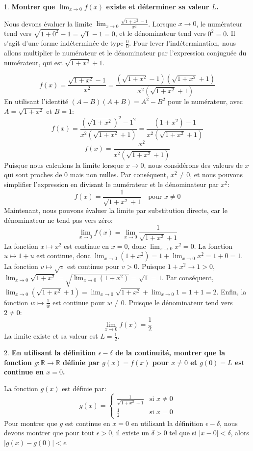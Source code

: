 \documentclass[12pt,a4paper]{report}
\begin{document}
1.  \textbf{Montrer que $\lim_{x \to 0} f(x)$ existe et déterminer sa valeur $L$.}

    Nous devons évaluer la limite $\lim_{x \to 0} \frac{\sqrt{1+x^2} - 1}{x^2}$.
    Lorsque $x \to 0$, le numérateur tend vers $\sqrt{1+0^2} - 1 = \sqrt{1} - 1 = 0$, et le dénominateur tend vers $0^2 = 0$. Il s'agit d'une forme indéterminée de type $\frac{0}{0}$.
    Pour lever l'indétermination, nous allons multiplier le numérateur et le dénominateur par l'expression conjuguée du numérateur, qui est $\sqrt{1+x^2} + 1$.

    $$ f(x) = \frac{\sqrt{1+x^2} - 1}{x^2} = \frac{(\sqrt{1+x^2} - 1)(\sqrt{1+x^2} + 1)}{x^2(\sqrt{1+x^2} + 1)} $$
    En utilisant l'identité $(A-B)(A+B) = A^2 - B^2$ pour le numérateur, avec $A = \sqrt{1+x^2}$ et $B = 1$:
    $$ f(x) = \frac{(\sqrt{1+x^2})^2 - 1^2}{x^2(\sqrt{1+x^2} + 1)} = \frac{(1+x^2) - 1}{x^2(\sqrt{1+x^2} + 1)} $$
    $$ f(x) = \frac{x^2}{x^2(\sqrt{1+x^2} + 1)} $$
    Puisque nous calculons la limite lorsque $x \to 0$, nous considérons des valeurs de $x$ qui sont proches de 0 mais non nulles. Par conséquent, $x^2 \neq 0$, et nous pouvons simplifier l'expression en divisant le numérateur et le dénominateur par $x^2$:
    $$ f(x) = \frac{1}{\sqrt{1+x^2} + 1} \quad \text{pour } x \neq 0 $$
    Maintenant, nous pouvons évaluer la limite par substitution directe, car le dénominateur ne tend pas vers zéro:
    $$ \lim_{x \to 0} f(x) = \lim_{x \to 0} \frac{1}{\sqrt{1+x^2} + 1} $$
    La fonction $x \mapsto x^2$ est continue en $x=0$, donc $\lim_{x \to 0} x^2 = 0$.
    La fonction $u \mapsto 1+u$ est continue, donc $\lim_{x \to 0} (1+x^2) = 1 + \lim_{x \to 0} x^2 = 1+0 = 1$.
    La fonction $v \mapsto \sqrt{v}$ est continue pour $v > 0$. Puisque $1+x^2 \to 1 > 0$, $\lim_{x \to 0} \sqrt{1+x^2} = \sqrt{\lim_{x \to 0} (1+x^2)} = \sqrt{1} = 1$.
    Par conséquent, $\lim_{x \to 0} (\sqrt{1+x^2} + 1) = \lim_{x \to 0} \sqrt{1+x^2} + \lim_{x \to 0} 1 = 1+1 = 2$.
    Enfin, la fonction $w \mapsto \frac{1}{w}$ est continue pour $w \neq 0$. Puisque le dénominateur tend vers $2 \neq 0$:
    $$ \lim_{x \to 0} f(x) = \frac{1}{2} $$
    La limite existe et sa valeur est $L = \frac{1}{2}$.

2.  \textbf{En utilisant la définition $\epsilon-\delta$ de la continuité, montrer que la fonction $g: \mathbb{R} \to \mathbb{R}$ définie par $g(x) = f(x)$ pour $x \neq 0$ et $g(0) = L$ est continue en $x=0$.}

    La fonction $g(x)$ est définie par:
    $$ g(x) = \begin{cases} \frac{1}{\sqrt{1+x^2} + 1} & \text{si } x \neq 0 \\ \frac{1}{2} & \text{si } x = 0 \end{cases} $$
    Pour montrer que $g$ est continue en $x=0$ en utilisant la définition $\epsilon-\delta$, nous devons montrer que pour tout $\epsilon > 0$, il existe un $\delta > 0$ tel que si $|x - 0| < \delta$, alors $|g(x) - g(0)| < \epsilon$.
\end{document}
